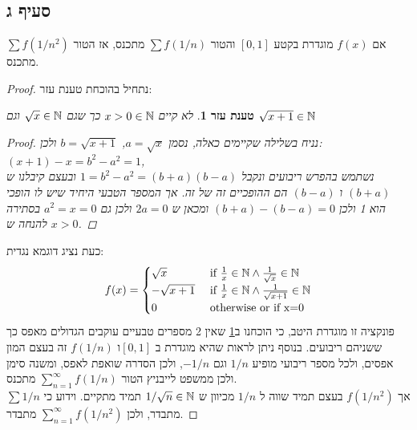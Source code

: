 \documentclass{article}
\newtheorem{lemma}[theorem]{טענת עזר}
\begin{document}
		\subsection*{סעיף ג}
		אם $f(x)$ מוגדרת בקטע $[0,1]$ והטור $\sum f(1/n)$ מתכנס, אז הטור $\sum f(1/n^2)$ מתכנס.
		\begin{proof}
			נתחיל בהוכחת טענת עזר:
			\begin{lemma}\label{lemma:1}
				לא קיים $x > 0 \in \mathbb{N}$ כך שגם $\sqrt{x} \in \mathbb{N}$ וגם $\sqrt{x+1} \in \mathbb{N}$
				\begin{proof}
					נניח בשלילה שקיימים כאלה, נסמן $a = \sqrt{x}$, $b = \sqrt{x+1}$
					ולכן: $(x+1) - x = b^2 - a^2 = 1$, \\
					 נשתמש בהפרש ריבועים ונקבל $1 = b^2 - a^2 = (b+a)(b-a)$
					 ובעצם קיבלנו ש $(b+a)$ ו $(b-a)$ הם ההופכיים זה של זה. אך המספר הטבעי היחיד שיש לו הופכי הוא 1 ולכן
					 $(b+a) - (b-a) = 0$ ומכאן ש $2a = 0$ ולכן גם $a^2=x=0$ בסתירה להנחה ש $x>0$.
				\end{proof}
			\end{lemma}

			כעת נציג דוגמא נגדית:
			\begin{align*}
				f(x) = \begin{cases}
					\sqrt{x} &\text{ if } \frac{1}{x} \in \mathbb{N} \land \frac{1}{\sqrt{x}} \in \mathbb{N} \\
					-\sqrt{x+1} &\text{ if } \frac{1}{x} \in \mathbb{N} \land \frac{1}{\sqrt{x+1}} \in \mathbb{N} \\
					0 &\text{ otherwise or if x=0 } \\
				\end{cases}
			\end{align*}
			פונקציה זו מוגדרת היטב, כי הוכחנו ב\ref{lemma:1} שאין 2 מספרים טבעיים עוקבים הגדולים מאפס כך ששניהם ריבועים.
			בנוסף ניתן לראות שהיא מוגדרת ב $[0,1]$ו $f(1/n)$ זה בעצם המון אפסים, ולכל מספר ריבועי מופיע $1/n$ וגם $-1/n$,
			 ולכן הסדרה שואפת לאפס, ומשנה סימן ולכן ממשפט לייבניץ הטור $\sum_{n=1}^\infty f(1/n)$ מתכנס. \\
			אך $f(1/n^2)$ בעצם תמיד שווה ל $1/n$ מכיוון ש $1/\sqrt{n} \in \mathbb{N}$ תמיד מתקיים. וידוע כי $\sum 1/n$ מתבדר, ולכן $\sum_{n=1}^\infty f(1/n^2)$ מתבדר.
		\end{proof}
\end{document}
